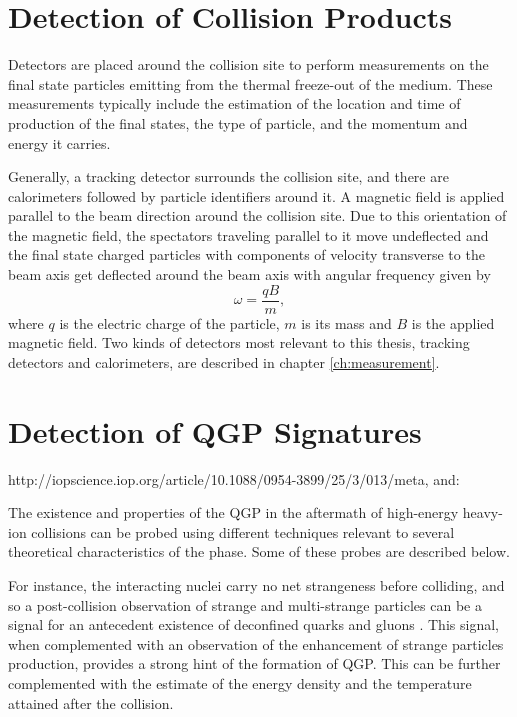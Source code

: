 \section{Detection of Collision Products}\label{subsection:detection}
Detectors are placed around the collision site to perform measurements on the final state particles emitting from the thermal freeze-out of the medium. These measurements typically include the estimation of the location and time of production of the final states, the type of particle, and the momentum and energy it carries.

Generally, a tracking detector surrounds the collision site, and there are calorimeters followed by particle identifiers around it. A magnetic field is applied parallel to the beam direction around the collision site. Due to this orientation of the magnetic field, the spectators traveling parallel to it move undeflected and the final state charged particles with components of velocity transverse to the beam axis get deflected around the beam axis with angular frequency given by
\begin{equation}\label{eqn:larmor}
\omega = \frac{qB}{m},
\end{equation}
where $q$ is the electric charge of the particle, $m$ is its mass and $B$ is the applied magnetic field.
Two kinds of detectors most relevant to this thesis, tracking detectors and calorimeters, are described in chapter \ref{ch:measurement}.

\section{Detection of QGP Signatures}\label{section:signatures}
http://iopscience.iop.org/article/10.1088/0954-3899/25/3/013/meta, and: 

The existence and properties of the QGP in the aftermath of high-energy heavy-ion collisions can be probed using different techniques relevant to several theoretical characteristics of the phase. Some of these probes are described below.

For instance, the interacting nuclei  carry no net strangeness before colliding, and so a post-collision observation of strange and multi-strange particles can be a signal for an antecedent existence of deconfined quarks and gluons \cite{1742-6596-455-1-012005}. This signal, when complemented with an observation of the enhancement of strange particles production, provides a strong hint of the formation of QGP. This can be further complemented with the estimate of the energy density and the temperature attained after the collision.

